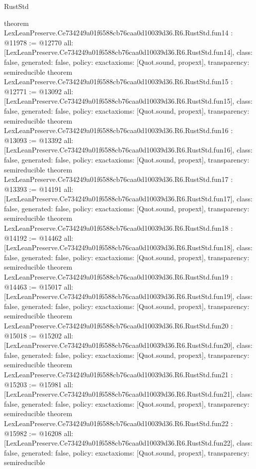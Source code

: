 \begin{lexlean}{RustStd}
\begin{coremodule}
{}
theorem LexLeanPreserve.Ce734249a01f6588cb76caa0d10039d36.R6.RustStd.fun14 : @11978 := @12770 {
  all: [LexLeanPreserve.Ce734249a01f6588cb76caa0d10039d36.R6.RustStd.fun14],
  class: false,
  generated: false,
  policy: exact{axioms: [Quot.sound, propext]},
  transparency: semireducible
}
theorem LexLeanPreserve.Ce734249a01f6588cb76caa0d10039d36.R6.RustStd.fun15 : @12771 := @13092 {
  all: [LexLeanPreserve.Ce734249a01f6588cb76caa0d10039d36.R6.RustStd.fun15],
  class: false,
  generated: false,
  policy: exact{axioms: [Quot.sound, propext]},
  transparency: semireducible
}
theorem LexLeanPreserve.Ce734249a01f6588cb76caa0d10039d36.R6.RustStd.fun16 : @13093 := @13392 {
  all: [LexLeanPreserve.Ce734249a01f6588cb76caa0d10039d36.R6.RustStd.fun16],
  class: false,
  generated: false,
  policy: exact{axioms: [Quot.sound, propext]},
  transparency: semireducible
}
theorem LexLeanPreserve.Ce734249a01f6588cb76caa0d10039d36.R6.RustStd.fun17 : @13393 := @14191 {
  all: [LexLeanPreserve.Ce734249a01f6588cb76caa0d10039d36.R6.RustStd.fun17],
  class: false,
  generated: false,
  policy: exact{axioms: [Quot.sound, propext]},
  transparency: semireducible
}
theorem LexLeanPreserve.Ce734249a01f6588cb76caa0d10039d36.R6.RustStd.fun18 : @14192 := @14462 {
  all: [LexLeanPreserve.Ce734249a01f6588cb76caa0d10039d36.R6.RustStd.fun18],
  class: false,
  generated: false,
  policy: exact{axioms: [Quot.sound, propext]},
  transparency: semireducible
}
theorem LexLeanPreserve.Ce734249a01f6588cb76caa0d10039d36.R6.RustStd.fun19 : @14463 := @15017 {
  all: [LexLeanPreserve.Ce734249a01f6588cb76caa0d10039d36.R6.RustStd.fun19],
  class: false,
  generated: false,
  policy: exact{axioms: [Quot.sound, propext]},
  transparency: semireducible
}
theorem LexLeanPreserve.Ce734249a01f6588cb76caa0d10039d36.R6.RustStd.fun20 : @15018 := @15202 {
  all: [LexLeanPreserve.Ce734249a01f6588cb76caa0d10039d36.R6.RustStd.fun20],
  class: false,
  generated: false,
  policy: exact{axioms: [Quot.sound, propext]},
  transparency: semireducible
}
theorem LexLeanPreserve.Ce734249a01f6588cb76caa0d10039d36.R6.RustStd.fun21 : @15203 := @15981 {
  all: [LexLeanPreserve.Ce734249a01f6588cb76caa0d10039d36.R6.RustStd.fun21],
  class: false,
  generated: false,
  policy: exact{axioms: [Quot.sound, propext]},
  transparency: semireducible
}
theorem LexLeanPreserve.Ce734249a01f6588cb76caa0d10039d36.R6.RustStd.fun22 : @15982 := @16208 {
  all: [LexLeanPreserve.Ce734249a01f6588cb76caa0d10039d36.R6.RustStd.fun22],
  class: false,
  generated: false,
  policy: exact{axioms: [Quot.sound, propext]},
  transparency: semireducible
}
\end{coremodule}
\end{lexlean}
